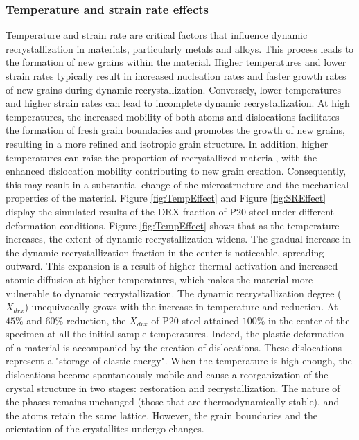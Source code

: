 \documentclass[metals,article,submit,pdftex,moreauthors]{Definitions/mdpi}
\begin{document}
\subsubsection{Temperature and strain rate effects \label{subsec:TempSReffect}}

Temperature and strain rate are critical factors that influence dynamic recrystallization in materials, particularly metals and alloys. 
This process leads to the formation of new grains within the material. 
Higher temperatures and lower strain rates typically result in increased nucleation rates and faster growth rates of new grains during dynamic recrystallization. 
Conversely, lower temperatures and higher strain rates can lead to incomplete dynamic recrystallization.
At high temperatures, the increased mobility of both atoms and dislocations facilitates the formation of fresh grain boundaries and promotes the growth of new grains, resulting
in a more refined and isotropic grain structure.
In addition, higher temperatures can raise the proportion of recrystallized material, with the enhanced dislocation mobility contributing to new grain creation.
Consequently, this may result in a substantial change of the microstructure and the mechanical properties of the material.
Figure \ref{fig:TempEffect} and Figure \ref{fig:SREffect} display the simulated results of the DRX fraction of P20 steel under different deformation conditions.
Figure \ref{fig:TempEffect} shows that as the temperature increases, the extent of dynamic recrystallization widens.
The gradual increase in the dynamic recrystallization fraction in the center is noticeable, spreading outward.
This expansion is a result of higher thermal activation and increased atomic diffusion at higher temperatures, which makes the material more vulnerable to dynamic recrystallization.
The dynamic recrystallization degree ($X_{drx}$) unequivocally grows with the increase in temperature and reduction.
At $45\%$ and $60\%$ reduction, the $X_{drx}$ of P20 steel
attained $100\%$ in the center of the specimen at all the initial sample temperatures.
Indeed, the plastic deformation of a material is accompanied by the creation of dislocations.
These dislocations represent a "storage of elastic energy".
When the temperature is high enough, the dislocations become spontaneously mobile and cause a reorganization of the crystal structure in two stages: restoration and recrystallization.
The nature of the phases remains unchanged (those that are thermodynamically stable), and the atoms retain the same lattice. 
However, the grain boundaries and the orientation of the crystallites undergo changes.
\end{document}
